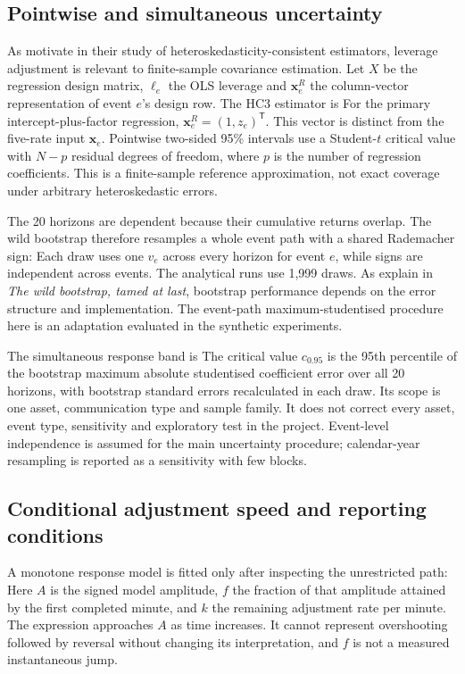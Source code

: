 \subsection{Pointwise and simultaneous uncertainty}
As  motivate in their study of heteroskedasticity-consistent estimators, leverage adjustment is relevant to finite-sample covariance estimation. Let $X$ be the regression design matrix, $\ell_e$ the OLS leverage and $\mathbf{x}^{R}_e$ the column-vector representation of event $e$'s design row. The HC3 estimator is
For the primary intercept-plus-factor regression, $\mathbf{x}^{R}_e=(1,z_e)^{\mathsf T}$. This vector is distinct from the five-rate input $\mathbf{x}_e$. Pointwise two-sided 95\% intervals use a Student-$t$ critical value with $N-p$ residual degrees of freedom, where $p$ is the number of regression coefficients. This is a finite-sample reference approximation, not exact coverage under arbitrary heteroskedastic errors.

The 20 horizons are dependent because their cumulative returns overlap. The wild bootstrap therefore resamples a whole event path with a shared Rademacher sign:
Each draw uses one $v_e$ across every horizon for event $e$, while signs are independent across events. The analytical runs use 1,999 draws. As  explain in \textit{The wild bootstrap, tamed at last}, bootstrap performance depends on the error structure and implementation. The event-path maximum-studentised procedure here is an adaptation evaluated in the synthetic experiments.

The simultaneous response band is
The critical value $c_{0.95}$ is the 95th percentile of the bootstrap maximum absolute studentised coefficient error over all 20 horizons, with bootstrap standard errors recalculated in each draw. Its scope is one asset, communication type and sample family. It does not correct every asset, event type, sensitivity and exploratory test in the project. Event-level independence is assumed for the main uncertainty procedure; calendar-year resampling is reported as a sensitivity with few blocks.

\subsection{Conditional adjustment speed and reporting conditions}
A monotone response model is fitted only after inspecting the unrestricted path:
Here $A$ is the signed model amplitude, $f$ the fraction of that amplitude attained by the first completed minute, and $k$ the remaining adjustment rate per minute. The expression approaches $A$ as time increases. It cannot represent overshooting followed by reversal without changing its interpretation, and $f$ is not a measured instantaneous jump.

